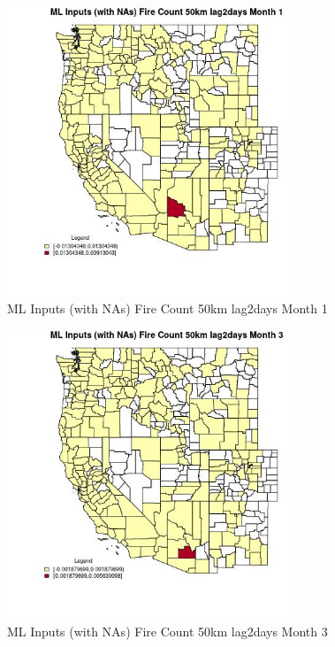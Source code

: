 \begin{figure} 
\centering  
\includegraphics[width=0.77\textwidth]{Code_Outputs/Report_ML_input_PM25_Step4_part_e_de_duplicated_aves_compiled_2019-05-21wNAs_CountyFire_Count_50km_lag2daysmedianMonth1.jpg} 
\caption{\label{fig:Report_ML_input_PM25_Step4_part_e_de_duplicated_aves_compiled_2019-05-21wNAsCountyFire_Count_50km_lag2daysmedianMonth1}ML Inputs (with NAs) Fire Count 50km lag2days Month 1} 
\end{figure} 
 

\clearpage 

\begin{figure} 
\centering  
\includegraphics[width=0.77\textwidth]{Code_Outputs/Report_ML_input_PM25_Step4_part_e_de_duplicated_aves_compiled_2019-05-21wNAs_CountyFire_Count_50km_lag2daysmedianMonth3.jpg} 
\caption{\label{fig:Report_ML_input_PM25_Step4_part_e_de_duplicated_aves_compiled_2019-05-21wNAsCountyFire_Count_50km_lag2daysmedianMonth3}ML Inputs (with NAs) Fire Count 50km lag2days Month 3} 
\end{figure} 
 


